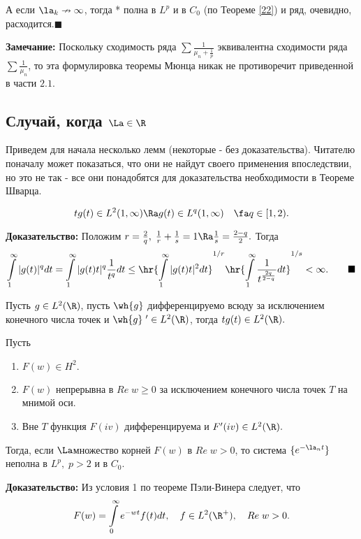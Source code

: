 \documentclass[a4paper]{article}
\begin{document}
А если $\la_k\nrightarrow\infty$, тогда * полна в $L^p$ и в
$C_0$ (по Теореме \ref{22}) и ряд, очевидно,
расходится.$\blacksquare$

\noindent\textbf{Замечание:} Поскольку сходимость ряда
$\sum\frac1{\mu_n+\frac1p}$ эквивалентна сходимости ряда
$\sum\frac1{\mu_n}$, то эта формулировка теоремы Мюнца никак не
противоречит приведенной в части $2.1.$


\subsection{Случай, когда $\La\in\R $}

Приведем для начала несколько лемм (некоторые - без
доказательства). Читателю поначалу может показаться, что они не
найдут своего применения впоследствии, но это не так - все они
понадобятся для доказательства необходимости в Теореме Шварца.

\begin{lemms}\label{35}
$$tg(t)\in L^2(1,\infty)\Ra g(t)\in
L^q(1,\infty)\quad\fa q\in[1,2).$$
\end{lemms}
\textbf{Доказательство:} Положим
$r=\frac2q,\;\frac1r+\frac1s=1\Ra \frac1s=\frac{2-q}2.$
Тогда
$$\int\limits_1^{\infty}|g(t)|^qdt=\int\limits_1^{\infty}|g(t)t|^q\frac1{t^q}dt\le\hr{\int\limits_1^{\infty}|g(t)t|^2dt}^{1/r}\hr{\int\limits_1^{\infty}\frac1{t^{\frac{2q}{2-q}}}dt}^{1/s}<\infty.\qquad\blacksquare$$

\begin{lemms}\label{34}
Пусть $g\in L^2(\R )$, пусть $\wh{g}$ дифференцируемо
всюду за исключением конечного числа точек и $\wh{g}\;'\in
L^2(\R )$, тогда $tg(t)\in L^2(\R ).$
\end{lemms}

\begin{lemms}\label{37}
Пусть
\begin{enumerate}
\item
$F(w)\in H^2.$
\item
$F(w)$ непрерывна в $Re\;w\ge0$ за исключением конечного числа
точек $T$ на мнимой оси.
\item
Вне $T$ функция $F(iv)$ дифференцируема и $F'(iv)\in
L^2(\R ).$

\end{enumerate}
Тогда, если $\La$\т множество корней $F(w)$ в $Re\;w>0$, то
система $\{e^{-\la_nt}\}$ неполна в $L^p,\; p>2$ и в $C_0.$
\end{lemms}
\textbf{Доказательство:} Из условия 1 по теореме Пэли-Винера
следует, что
$$F(w)=\int\limits_0^{\infty}e^{-wt}f(t)dt,\quad f\in
L^2(\R ^{+}),\quad Re\;w>0.$$
\end{document}
